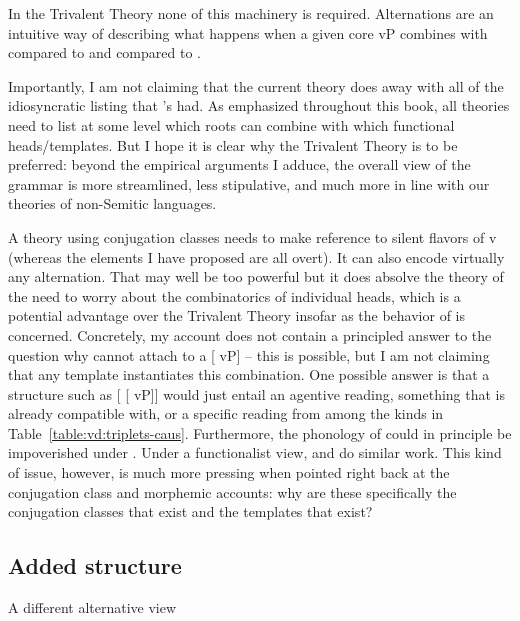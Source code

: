 \begin{exe}
\begin{xlist}
\begin{xlist}
\begin{exe}
\begin{exe}
\begin{xlist}
\begin{exe}
\begin{xlist}
\begin{exe}
\begin{xlist}
\begin{xlist}
\begin{exe}
\begin{xlist}
\begin{exe}
\begin{xlist}
\begin{exe}
\begin{xlist}
\begin{exe}
\begin{exe}
\begin{exe}
\begin{xlist}
\begin{exe}
\begin{exe}
\begin{xlist}
\begin{xlist}
\begin{exe}
\begin{xlist}
\begin{exe}
\begin{exe}
\begin{xlist}
\begin{exe}
\begin{exe}
\begin{xlist}
\begin{exe}
\begin{xlist}
\begin{exe}
\begin{xlist}
\begin{exe}
\begin{xlist}
\begin{exe}
\begin{exe}
\begin{xlist}
\begin{exe}
\begin{exe}
\begin{xlist}
\begin{xlist}
\begin{exe}
\begin{xlist}
\begin{xlist}
\begin{exe}
\begin{xlist}
\begin{exe}
\begin{xlist}
\begin{exe}
\begin{xlist}
\begin{exe}
\begin{xlist}
\begin{exe}
\begin{exe}
\begin{exe}
\begin{exe}
\begin{xlist}
\begin{exe}
\begin{exe}
\begin{xlist}
\begin{xlist}
\begin{exe}
\begin{exe}
\begin{xlist}
\begin{exe}
\begin{xlist}
In the Trivalent Theory none of this machinery is required. Alternations are an intuitive way of describing what happens when a given core vP combines with  compared to {\vz} and compared to {\vd}.

Importantly, I am not claiming that the current theory does away with all of the idiosyncratic listing that \citeauthor{arad05}'s had. As emphasized throughout this book, all theories need to list at some level which roots can combine with which functional heads/templates. But I hope it is clear why the Trivalent Theory is to be preferred: beyond the empirical arguments I adduce, the overall view of the grammar is more streamlined, less stipulative, and much more in line with our theories of non-Semitic languages.

A theory using conjugation classes needs to make reference to silent flavors of v (whereas the elements I have proposed are all overt). It can also encode virtually any alternation. That may well be too powerful but it does absolve the theory of the need to worry about the combinatorics of individual heads, which is a potential advantage over the Trivalent Theory insofar as the behavior of {\vd} is concerned. Concretely, my account does not contain a principled answer to the question why {\vd} cannot attach to a [{\va} vP] -- this is possible, but I am not claiming that any template instantiates this combination. One possible answer is that a structure such as [{\vd} [{\va} vP]] would just entail an agentive reading, something that {\vd} is already compatible with, or a specific  reading from among the kinds in Table~\ref{table:vd:triplets-caus}. Furthermore, the phonology of {\va} could in principle be impoverished under {\vd}. Under a functionalist view, {\va} and {\vd} do similar work. This kind of issue, however, is much more pressing when pointed right back at the conjugation class and morphemic accounts: why are these specifically the conjugation classes that exist and the templates that exist?

	\subsection{Added structure} \label{vd:others:struct}
A different alternative view 
\end{xlist}
\end{exe}
\end{xlist}
\end{exe}
\end{exe}
\end{xlist}
\end{xlist}
\end{exe}
\end{exe}
\end{xlist}
\end{exe}
\end{exe}
\end{exe}
\end{exe}
\end{xlist}
\end{exe}
\end{xlist}
\end{exe}
\end{xlist}
\end{exe}
\end{xlist}
\end{exe}
\end{xlist}
\end{xlist}
\end{exe}
\end{xlist}
\end{xlist}
\end{exe}
\end{exe}
\end{xlist}
\end{exe}
\end{exe}
\end{xlist}
\end{exe}
\end{xlist}
\end{exe}
\end{xlist}
\end{exe}
\end{xlist}
\end{exe}
\end{exe}
\end{xlist}
\end{exe}
\end{exe}
\end{xlist}
\end{exe}
\end{xlist}
\end{xlist}
\end{exe}
\end{exe}
\end{xlist}
\end{exe}
\end{exe}
\end{exe}
\end{xlist}
\end{exe}
\end{xlist}
\end{exe}
\end{xlist}
\end{exe}
\end{xlist}
\end{xlist}
\end{exe}
\end{xlist}
\end{exe}
\end{xlist}
\end{exe}
\end{exe}
\end{xlist}
\end{xlist}
\end{exe}

